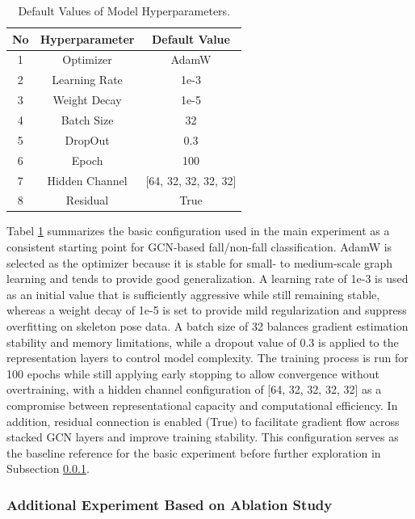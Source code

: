 \documentclass[10pt,TimesNewRoman,a4paper]{matrikenglish}
\begin{document}
\begin{table}[ht]
    \centering
    \caption{Default Values of Model Hyperparameters.}
    \label{table:3. hyperparamter default}
    \begin{tabular}{ c c c }
        \hline
        \textbf{No} & \textbf{Hyperparameter} & \textbf{Default Value} \\
        \hline
        1 & Optimizer & AdamW \\
        2 & Learning Rate & 1e-3 \\
        3 & Weight Decay & 1e-5 \\
        4 & Batch Size & 32 \\
        5 & DropOut & 0.3 \\
        6 & Epoch & 100 \\
        7 & Hidden Channel & [64, 32, 32, 32, 32] \\
        8 & Residual & True \\
        \hline
    \end{tabular}
\end{table}

Tabel \ref{table:3. hyperparamter default} summarizes the basic configuration used in the main experiment as a consistent starting point for GCN-based fall/non-fall classification. AdamW is selected as the optimizer because it is stable for small- to medium-scale graph learning and tends to provide good generalization. A learning rate of 1e-3 is used as an initial value that is sufficiently aggressive while still remaining stable, whereas a weight decay of 1e-5 is set to provide mild regularization and suppress overfitting on skeleton pose data. A batch size of 32 balances gradient estimation stability and memory limitations, while a dropout value of 0.3 is applied to the representation layers to control model complexity. The training process is run for 100 epochs while still applying early stopping to allow convergence without overtraining, with a hidden channel configuration of [64, 32, 32, 32, 32] as a compromise between representational capacity and computational efficiency. In addition, residual connection is enabled (True) to facilitate gradient flow across stacked GCN layers and improve training stability. This configuration serves as the baseline reference for the basic experiment before further exploration in Subsection \ref{III.evaluasi ablasi}. \par

\subsubsection{Additional Experiment Based on Ablation Study} \label{III.evaluasi ablasi}
\end{document}
